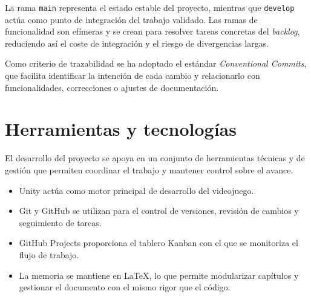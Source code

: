 La rama \texttt{main} representa el estado estable del proyecto, mientras que
\texttt{develop} actúa como punto de integración del trabajo validado. Las ramas de
funcionalidad son efímeras y se crean para resolver tareas concretas del \textit{backlog},
reduciendo así el coste de integración y el riesgo de divergencias largas.

Como criterio de trazabilidad se ha adoptado el estándar \textit{Conventional Commits},
que facilita identificar la intención de cada cambio y relacionarlo con funcionalidades,
correcciones o ajustes de documentación.

\section{Herramientas y tecnologías}
El desarrollo del proyecto se apoya en un conjunto de herramientas técnicas y de gestión
que permiten coordinar el trabajo y mantener control sobre el avance.

\begin{itemize}
    \item Unity actúa como motor principal de desarrollo del videojuego.
    \item Git y GitHub se utilizan para el control de versiones, revisión de cambios y seguimiento de tareas.
    \item GitHub Projects proporciona el tablero Kanban con el que se monitoriza el flujo de trabajo.
    \item La memoria se mantiene en LaTeX, lo que permite modularizar capítulos y gestionar el documento con el mismo rigor que el código.
\end{itemize}
